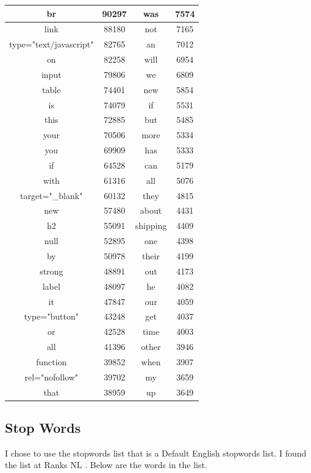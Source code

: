 \documentclass[12pt]{article}
\begin{document}
\begin{longtable}{|c|c|c|c|}
    \hline
    br & 90297 & was & 7574 \\
    \hline
    link & 88180 & not & 7165 \\
    \hline
    type="text/javascript" & 82765 & an & 7012 \\
    \hline
    on & 82258 & will & 6954 \\
    \hline
    input & 79806 & we & 6809 \\
    \hline
    table & 74401 & new & 5854 \\
    \hline
    is & 74079 & if & 5531 \\
    \hline
    this & 72885 & but & 5485 \\
    \hline
    your & 70506 & more & 5334 \\
    \hline
    you & 69909 & has & 5333 \\
    \hline
    if & 64528 & can & 5179 \\
    \hline
    with & 61316 & all & 5076 \\
    \hline
    target="\_blank" & 60132 & they & 4815 \\
    \hline
    new & 57480 & about & 4431 \\
    \hline
    h2 & 55091 & shipping & 4409 \\
    \hline
    null & 52895 & one & 4398 \\
    \hline
    by & 50978 & their & 4199 \\
    \hline
    strong & 48891 & out & 4173 \\
    \hline
    label & 48097 & he & 4082 \\
    \hline
    it & 47847 & our & 4059 \\
    \hline
    type="button" & 43248 & get & 4037 \\
    \hline
    or & 42528 & time & 4003 \\
    \hline
    all & 41396 & other & 3946 \\
    \hline
    function & 39852 & when & 3907 \\
    \hline
    rel="nofollow" & 39702 & my & 3659 \\
    \hline
    that & 38959 & up & 3649 \\
    \hline
\end{longtable}

\subsection{Stop Words}

I chose to use the stopwords list that is a Default English stopwords list. I found the list at Ranks NL \nocite{Doyle:ranksNL}.  Below are the words in the list.
\end{document}
